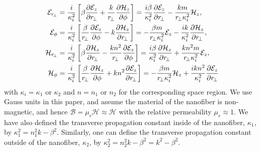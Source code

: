 \documentclass[preprint,aps,pra,onecolumn]{revtex4-1} %
\begin{document}
\begin{subequations}\label{EHzgauss}
\begin{align}
\mathcal{E}_{r\!_\perp} &= \frac{i}{\kappa_i^2} \left[ \beta \pp{\mathcal{E}_z }{r\!_\perp} + 
  \frac{k}{r\!_\perp} 
\pp{\mathcal{H}_z}{\phi} \right]= \frac{i\beta}{\kappa_i^2} \pp{\mathcal{E}_z }{r\!_\perp} - 
  \frac{km}{r\!_\perp \kappa_i^2} {\mathcal{H}_z}, \\
\mathcal{E}_\phi &= \frac{i}{\kappa_i^2} \left[\frac{\beta}{r\!_\perp} 
\pp{\mathcal{E}_z}{\phi} - k 
\pp{\mathcal{H}_z}{r\!_\perp} 
\right] = -\frac{\beta m}{r\!_\perp \kappa_i^2} 
{\mathcal{E}_z} - \frac{ik}{\kappa_i^2} 
\pp{\mathcal{H}_z}{r\!_\perp},\\
\mathcal{H}_{r\!_\perp} &= \frac{i}{\kappa_i^2} \left[ \beta \pp{\mathcal{H}_z}{r\!_\perp} 
- \frac{kn^2}{r\!_\perp}\pp{\mathcal{E}_z}{\phi} \right]= \frac{i\beta}{\kappa_i^2} \pp{\mathcal{H}_z}{r\!_\perp} 
+ \frac{kn^2m}{r\!_\perp \kappa_i^2} {\mathcal{E}_z},\\
\mathcal{H}_\phi &= \frac{i}{\kappa_i^2} \left[ \frac{\beta}{r\!_\perp} \pp{\mathcal{H}_z}{\phi} + 
 kn^2 \pp{\mathcal{E}_z}{r\!_\perp} \right] = -\frac{\beta m}{r\!_\perp \kappa_i^2} {\mathcal{H}_z} + 
  \frac{ikn^2}{\kappa_i^2} \pp{\mathcal{E}_z}{r\!_\perp}
\end{align}
\end{subequations}
with $ \kappa_i=\kappa_1 $ or $ \kappa_2 $ and $ n=n_1 $ or $ n_2 $ for the corresponding space region. 
We use Gauss units in this paper, and assume the material of the nanofiber is non-magnetic, and hence $ 
\boldsymbol{\mathcal{B}}= \mu_r\boldsymbol{\mathcal{H}}\approx \boldsymbol{\mathcal{H}} $ with the relative permeability $ \mu_r\approx 1 $. We have also defined the transverse propagation constant inside of the nanofiber, $ \kappa_1 $, by $\kappa_1^2=n_1^2k-\beta^2$. Similarly, one can define the transverse propagation constant outside of the nanofiber, $ \kappa_2 $, by $ \kappa_2^2=n_2^2k-\beta^2=k^2-\beta^2 $.
\end{document}
